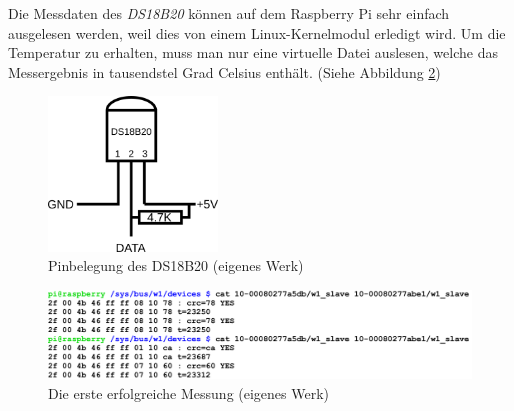 Die Messdaten des \textit{DS18B20} können auf dem Raspberry Pi sehr einfach ausgelesen werden, weil dies von einem Linux-\gls{Kernelmodul} erledigt wird. Um die Temperatur zu erhalten, muss man nur eine virtuelle Datei auslesen, welche das Messergebnis in tausendstel Grad Celsius enthält. (Siehe Abbildung \ref{fig:temp_screenshot})
\begin{figure}
  \centering
     \includegraphics[width=0.4\textwidth]{figures/temp_pin.png}
  \caption{Pinbelegung des DS18B20 (eigenes Werk)}
  \label{fig:temp_pin}
\end{figure}
\begin{figure}[h]
  \centering
     \includegraphics[width=\textwidth]{figures/temp_screenshot.png}
  \caption{Die erste erfolgreiche Messung (eigenes Werk)}
  \label{fig:temp_screenshot}
\end{figure}
